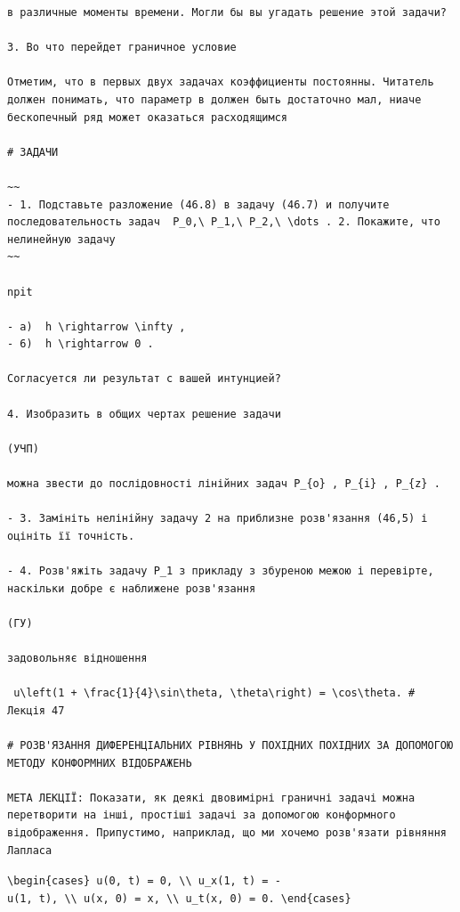 \documentclass[
  ukrainian,
]{article}
\begin{document}
\begin{verbatim}
в различные моменты времени. Могли бы вы угадать решение этой задачи?

3. Во что перейдет граничное условие

Отметим, что в первых двух задачах коэффициенты постоянны. Читатель должен понимать, что параметр в должен быть достаточно мал, ниаче бескопечный ряд может оказаться расходящимся

# ЗАДАЧИ

~~
- 1. Подставьте разложение (46.8) в задачу (46.7) и получите последовательность задач  P_0,\ P_1,\ P_2,\ \dots . 2. Покажите, что нелинейную задачу
~~

npit

- a)  h \rightarrow \infty ,
- 6)  h \rightarrow 0 .

Согласуется ли результат с вашей интунцией?

4. Изобразить в общих чертах решение задачи

(УЧП)

можна звести до послідовності лінійних задач P_{o} , P_{i} , P_{z} .

- 3. Замініть нелінійну задачу 2 на приблизне розв'язання (46,5) і оцініть її точність.

- 4. Розв'яжіть задачу P_1 з прикладу з збуреною межою і перевірте, наскільки добре є наближене розв'язання

(ГУ)

задовольняє відношення

 u\left(1 + \frac{1}{4}\sin\theta, \theta\right) = \cos\theta. # Лекція 47

# РОЗВ'ЯЗАННЯ ДИФЕРЕНЦІАЛЬНИХ РІВНЯНЬ У ПОХІДНИХ ПОХІДНИХ ЗА ДОПОМОГОЮ МЕТОДУ КОНФОРМНИХ ВІДОБРАЖЕНЬ

МЕТА ЛЕКЦІЇ: Показати, як деякі двовимірні граничні задачі можна перетворити на інші, простіші задачі за допомогою конформного відображення. Припустимо, наприклад, що ми хочемо розв'язати рівняння Лапласа
\end{verbatim}

\texttt{\textbackslash{}begin\{cases\}\ u(0,\ t)\ =\ 0,\ \textbackslash{}\textbackslash{}\ u\_x(1,\ t)\ =\ -u(1,\ t),\ \textbackslash{}\textbackslash{}\ u(x,\ 0)\ =\ x,\ \textbackslash{}\textbackslash{}\ u\_t(x,\ 0)\ =\ 0.\ \textbackslash{}end\{cases\}}
\end{document}
